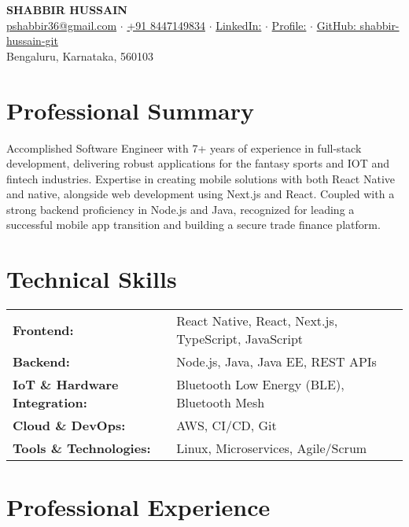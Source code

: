 \documentclass[11pt,a4paper]{article}
\begin{document}
\begin{center}
    {\LARGE\textbf{SHABBIR HUSSAIN}}\\[8pt]
    \href{mailto:pshabbir36@gmail.com}{pshabbir36@gmail.com} $\cdot$ 
    \href{tel:+1234567890}{+91 8447149834} $\cdot$ 
    \href{https://www.linkedin.com/in/hshabbir36}{LinkedIn:} $\cdot$ 
    \href{https://shabbir-hussain-git.vercel.app/}{Profile:} $\cdot$ 
    \href{https://github.com/shabbir-hussain-git}{GitHub: shabbir-hussain-git}\\[4pt]
    Bengaluru, Karnataka, 560103
\end{center}

\vspace{8pt}

\section{Professional Summary}
Accomplished Software Engineer with 7+ years of experience in full-stack development, delivering robust applications for the fantasy sports and IOT and fintech industries. Expertise in creating mobile solutions with both React Native and native, alongside web development using Next.js and React. Coupled with a strong backend proficiency in Node.js and Java, recognized for leading a successful mobile app transition and building a secure trade finance platform.

\section{Technical Skills}
\begin{tabularx}{\textwidth}{@{}l X@{}}
\textbf{Frontend:} &  React Native, React, Next.js, TypeScript, JavaScript \\
\textbf{Backend:} & Node.js, Java, Java EE, REST APIs \\
\textbf{IoT \& Hardware Integration:} & Bluetooth Low Energy (BLE), Bluetooth Mesh \\
\textbf{Cloud \& DevOps:} & AWS, CI/CD, Git \\
\textbf{Tools \& Technologies:} & Linux, Microservices, Agile/Scrum \\
\end{tabularx}

\section{Professional Experience}
\end{document}
